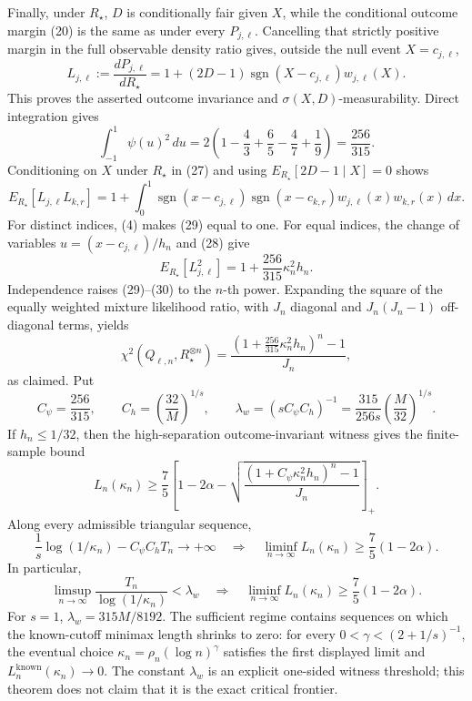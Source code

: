 Finally, under \(R_\star\), \(D\) is conditionally fair given \(X\), while the conditional outcome margin (20) is the same as under every \(P_{j,\ell}\).  Cancelling that strictly positive margin in the full observable density ratio gives, outside the null event \(X=c_{j,\ell}\),
\[
 L_{j,\ell}:=\frac{dP_{j,\ell}}{dR_\star}
 =1+(2D-1)\operatorname{sgn}(X-c_{j,\ell})w_{j,\ell}(X).
 \tag{27}
\]
This proves the asserted outcome invariance and \(\sigma(X,D)\)-measurability.  Direct integration gives
\[
 \int_{-1}^{1}\psi(u)^2\,du
 =2\left(1-\frac43+\frac65-\frac47+\frac19\right)
 =\frac{256}{315}.
 \tag{28}
\]
Conditioning on \(X\) under \(R_\star\) in (27) and using
\(E_{R_\star}[2D-1\mid X]=0\) shows
\[
 E_{R_\star}[L_{j,\ell}L_{k,r}]
 =1+\int_0^1
   \operatorname{sgn}(x-c_{j,\ell})
   \operatorname{sgn}(x-c_{k,r})
   w_{j,\ell}(x)w_{k,r}(x)\,dx.
 \tag{29}
\]
For distinct indices, (4) makes (29) equal to one.  For equal indices, the change of variables \(u=(x-c_{j,\ell})/h_n\) and (28) give
\[
 E_{R_\star}[L_{j,\ell}^2]
 =1+\frac{256}{315}\kappa_n^2h_n.
 \tag{30}
\]
Independence raises (29)--(30) to the \(n\)-th power.  Expanding the square of the equally weighted mixture likelihood ratio, with \(J_n\) diagonal and \(J_n(J_n-1)\) off-diagonal terms, yields
\[
 \chi^2(Q_{\ell,n},R_\star^{\otimes n})
 =\frac{\left(1+\frac{256}{315}\kappa_n^2h_n\right)^n-1}{J_n},
\]
as claimed.
Put
\[
 C_\psi=\frac{256}{315},
 \qquad
 C_h=\left(\frac{32}{M}\right)^{1/s},
 \qquad
 \lambda_w=(sC_\psi C_h)^{-1}
 =\frac{315}{256s}\left(\frac{M}{32}\right)^{1/s}.
\]
If \(h_n\le1/32\), then the high-separation outcome-invariant witness gives the finite-sample bound
\[
 L_n(\kappa_n)
 \ge\frac75\left[
 1-2\alpha-
 \sqrt{\frac{\left(1+C_\psi\kappa_n^2h_n\right)^n-1}{J_n}}
 \right]_+.
\]
Along every admissible triangular sequence,
\[
 \frac1s\log(1/\kappa_n)-C_\psi C_hT_n\longrightarrow+\infty
 \quad\Longrightarrow\quad
 \liminf_{n\to\infty}L_n(\kappa_n)
 \ge\frac75(1-2\alpha).
\]
In particular,
\[
 \limsup_{n\to\infty}
 \frac{T_n}{\log(1/\kappa_n)}<\lambda_w
 \quad\Longrightarrow\quad
 \liminf_{n\to\infty}L_n(\kappa_n)
 \ge\frac75(1-2\alpha).
\]
For \(s=1\), \(\lambda_w=315M/8192\).  The sufficient regime contains sequences on which the known-cutoff minimax length shrinks to zero: for every \(0<\gamma<(2+1/s)^{-1}\), the eventual choice \(\kappa_n=\rho_n(\log n)^\gamma\) satisfies the first displayed limit and \(L_n^{\mathrm{known}}(\kappa_n)\to0\).  The constant \(\lambda_w\) is an explicit one-sided witness threshold; this theorem does not claim that it is the exact critical frontier.
